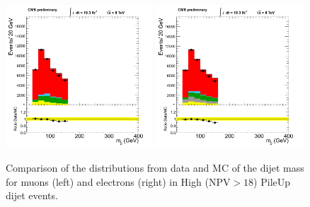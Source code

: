 \begin{figure}[h!t]
  {\centering
    \includegraphics[width=0.49\textwidth]{figs/puchecks/mu_HighNPV_mjj.png}
    \includegraphics[width=0.49\textwidth]{figs/puchecks/el_HighNPV_mjj.png}
    \caption{Comparison of the distributions from data and MC of the
    dijet mass for muons (left) and electrons (right)
    in High (NPV$>18$) PileUp dijet events.}
\label{fig:pu_mjjHigh}}
\end{figure}
